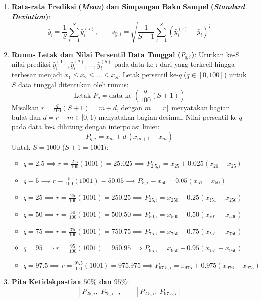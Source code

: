 \documentclass[11pt,a4paper]{article}
\theoremstyle{plain}
\theoremstyle{definition}
\theoremstyle{remark}
\begin{document}
\begin{enumerate}
    \item \textbf{Rata-rata Prediksi (\textit{Mean}) dan Simpangan Baku Sampel (\textit{Standard Deviation})}:
    \begin{equation}
        \bar{\hat{y}}_{i} = \frac{1}{S} \sum_{s=1}^{S} \hat{y}_{i}^{(s)}, \qquad s_{\hat{y}, i} = \sqrt{\frac{1}{S - 1} \sum_{s=1}^{S} \left( \hat{y}_{i}^{(s)} - \bar{\hat{y}}_{i} \right)^2} \label{eq:mean_std_mc}
    \end{equation}
    \item \textbf{Rumus Letak dan Nilai Persentil Data Tunggal ($P_{q, i}$)}:
    Urutkan ke-$S$ nilai prediksi $\hat{y}_{i}^{(1)}, \hat{y}_{i}^{(2)}, \dots, \hat{y}_{i}^{(S)}$ pada data ke-$i$ dari yang terkecil hingga terbesar menjadi $x_1 \le x_2 \le \dots \le x_S$. Letak persentil ke-$q$ ($q \in [0, 100]$) untuk $S$ data tunggal ditentukan oleh rumus:
    \begin{equation}
        \text{Letak } P_q = \text{data ke-}\left( \frac{q}{100}(S + 1) \right) \label{eq:letak_persentil}
    \end{equation}
    Misalkan $r = \frac{q}{100}(S + 1) = m + d$, dengan $m = \lfloor r \rfloor$ menyatakan bagian bulat dan $d = r - m \in [0, 1)$ menyatakan bagian desimal. Nilai persentil ke-$q$ pada data ke-$i$ dihitung dengan interpolasi linier:
    \begin{equation}
        P_{q, i} = x_m + d\,(x_{m+1} - x_m) \label{eq:rumus_persentil}
    \end{equation}
    Untuk $S = 1000$ ($S + 1 = 1001$):
    \begin{itemize}
        \item $q = 2.5 \implies r = \frac{2.5}{100}(1001) = 25.025 \implies P_{2.5, i} = x_{25} + 0.025(x_{26} - x_{25})$
        \item $q = 5 \implies r = \frac{5}{100}(1001) = 50.05 \implies P_{5, i} = x_{50} + 0.05(x_{51} - x_{50})$
        \item $q = 25 \implies r = \frac{25}{100}(1001) = 250.25 \implies P_{25, i} = x_{250} + 0.25(x_{251} - x_{250})$
        \item $q = 50 \implies r = \frac{50}{100}(1001) = 500.50 \implies P_{50, i} = x_{500} + 0.50(x_{501} - x_{500})$
        \item $q = 75 \implies r = \frac{75}{100}(1001) = 750.75 \implies P_{75, i} = x_{750} + 0.75(x_{751} - x_{750})$
        \item $q = 95 \implies r = \frac{95}{100}(1001) = 950.95 \implies P_{95, i} = x_{950} + 0.95(x_{951} - x_{950})$
        \item $q = 97.5 \implies r = \frac{97.5}{100}(1001) = 975.975 \implies P_{97.5, i} = x_{975} + 0.975(x_{976} - x_{975})$
    \end{itemize}
    \item \textbf{Pita Ketidakpastian $50\%$ dan $95\%$}:
    \begin{equation}
        \left[ P_{25, i},\; P_{75, i} \right], \qquad \left[ P_{2.5, i},\; P_{97.5, i} \right] \label{eq:band_interval}
    \end{equation}
\end{enumerate}
\end{document}
